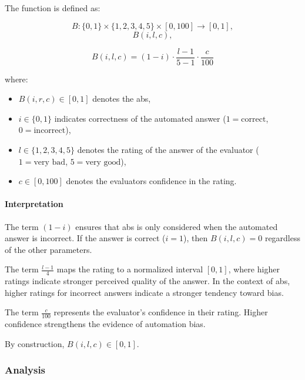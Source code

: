 \documentclass[sigconf,natbib=false]{acmart}
\begin{document}
The function is defined as:

\begin{equation*}
B : \{0,1\} \times \{1,2,3,4,5\} \times [0,100] \to [0,1],
\end{equation*}
\begin{equation*}
B(i,l,c),
\end{equation*}

\begin{equation}
B(i,l,c)
=
(1 - i)
\cdot
\frac{l - 1}{5 - 1}
\cdot
\frac{c}{100}
\label{eq:B}
\end{equation}

where:
\begin{itemize}
    \item $B(i,r,c) \in [0,1]$ denotes the \acrlong{abs},
    \item $i \in \{0,1\}$ indicates correctness of the automated answer
          ($1 = \text{correct}$, $0 = \text{incorrect}$),
    \item $l \in \{1,2,3,4,5\}$ denotes the rating of the answer
 of the evaluator ($1 = \text{very bad}$, $5 = \text{very good}$),
    \item $c \in [0,100]$ denotes the evaluators confidence in the rating.
\end{itemize}

\paragraph{Interpretation}

The term $(1 - i)$ ensures that \gls{abs} is only considered when the
automated answer is incorrect.
If the answer is correct ($i=1$), then
$B(i,l,c)=0$ regardless of the other parameters.

The term
\(
\frac{l - 1}{4}
\)
maps the rating to a normalized interval $[0,1]$, where higher ratings indicate stronger perceived quality of the answer.
In the context of \gls{abs}, higher ratings for incorrect answers indicate a stronger tendency toward bias.

The term
\(
\frac{c}{100}
\)
represents the evaluator's confidence in their rating.
Higher confidence
strengthens the evidence of automation bias.

By construction, \(B(i,l,c) \in [0,1]\).


\subsubsection {Analysis}
\label{sec:core_data}
\end{document}
